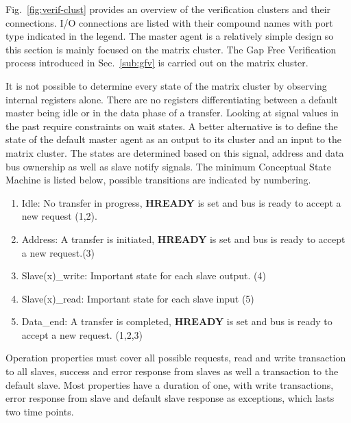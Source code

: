 Fig.~\ref{fig:verif-clust} provides an overview of the verification clusters and their connections. I/O connections are listed with their compound names with port type indicated in the legend. The master agent is a relatively simple design so this section is mainly focused on the matrix cluster. The Gap Free Verification process introduced in Sec.~\ref{sub:gfv} is carried out on the matrix cluster. \par
It is not possible to determine every state of the matrix cluster by observing internal registers alone. There are no registers differentiating between a default master being idle or in the data phase of a transfer. Looking at signal values in the past require constraints on wait states. A better alternative is to define the state of the default master agent as an output to its cluster and an input to the matrix cluster. The states are determined based on this signal, address and data bus ownership as well as slave notify signals. The minimum Conceptual State Machine is listed below, possible transitions are indicated by numbering. 
\begin{enumerate}
 \item Idle: No transfer in progress, \textbf{HREADY} is set and bus is ready to accept a new request (1,2).
 \item Address: A transfer is initiated, \textbf{HREADY} is set and bus is ready to accept a new request.(3)
 \item Slave(x)\_write: Important state for each slave output. (4)
 \item Slave(x)\_read: Important state for each slave input (5)
 \item Data\_end: A transfer is completed, \textbf{HREADY} is set and bus is ready to accept a new request. (1,2,3) 
\end{enumerate}

Operation properties must cover all possible requests, read and write transaction to all slaves, success and error response from slaves as well a transaction to the default slave. Most properties have a duration of one, with write transactions, error response from slave and default slave response as exceptions, which lasts two time points. 

